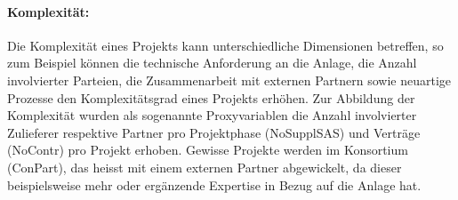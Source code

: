 \paragraph{Komplexität:} Die Komplexität eines Projekts kann unterschiedliche Dimensionen betreffen, so zum Beispiel können die technische Anforderung an die Anlage, die Anzahl involvierter Parteien, die Zusammenarbeit mit externen Partnern sowie neuartige Prozesse den Komplexitätsgrad eines Projekts erhöhen. Zur Abbildung der Komplexität wurden als sogenannte Proxyvariablen die Anzahl involvierter Zulieferer respektive Partner pro Projektphase (NoSupplSAS) und Verträge (NoContr) pro Projekt erhoben. Gewisse Projekte werden im Konsortium (ConPart), das heisst mit einem externen Partner abgewickelt, da dieser beispielsweise mehr oder ergänzende Expertise in Bezug auf die Anlage hat.
%
